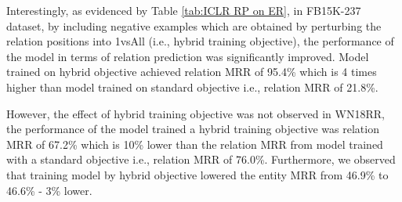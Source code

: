 \begin{table}[!htbp]
\centering
{}
\caption[Model performance in three objectives (selected on entity MRR)]{Model performance in standard, hybrid and relation training objectives on FB15K-237 and WN18RR. The best models were selected on entity MRR. }
\label{tab:ICLR RP on ER}
\end{table}

Interestingly, as evidenced by Table \ref{tab:ICLR RP on ER}, in FB15K-237 dataset, by including negative examples which are obtained by perturbing the relation positions into 1vsAll (i.e., hybrid training objective), the performance of the model in terms of relation prediction was significantly improved. Model trained on hybrid objective achieved relation MRR of 95.4\% which is 4 times higher than model trained on standard objective i.e., relation MRR of 21.8\%. 

However, the effect of hybrid training objective was not observed in WN18RR, the performance of the model trained a hybrid training objective was relation MRR of 67.2\% which is 10\% lower than the relation MRR from model trained with a standard objective i.e., relation MRR of 76.0\%. Furthermore, we observed that training model by hybrid objective lowered the entity MRR from 46.9\% to 46.6\% - 3\% lower.

